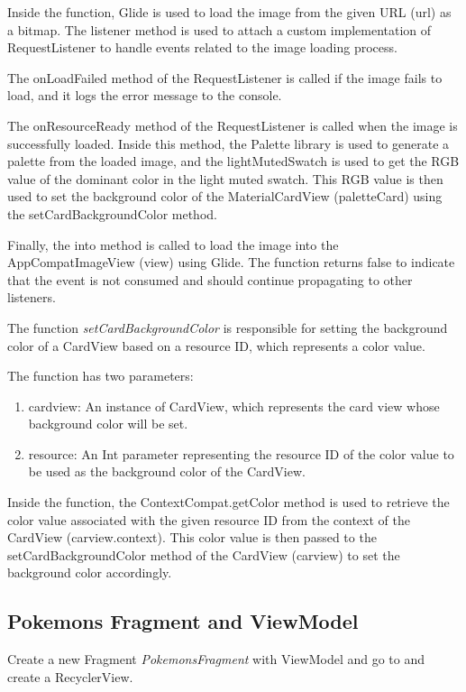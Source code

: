 \documentclass[a4paper, 12pt]{article}
\begin{document}
Inside the function, Glide is used to load the image from the given URL (url) as a bitmap. The listener method is used to attach a custom implementation of 
RequestListener to handle events related to the image loading process.

The onLoadFailed method of the RequestListener is called if the image fails to load, and it logs the error message to the console.

The onResourceReady method of the RequestListener is called when the image is successfully loaded. Inside this method, the Palette library is used to generate a palette from the loaded image, and the lightMutedSwatch is used to get the RGB value of the dominant color in the light muted swatch. This RGB value is then used to set the background color of the MaterialCardView (paletteCard) using the setCardBackgroundColor method.

Finally, the into method is called to load the image into the AppCompatImageView (view) using Glide. The function returns false to indicate that the event is not consumed and should continue propagating to other listeners.

The function \textit{setCardBackgroundColor} is responsible for setting the background color of a CardView based on a resource ID, which represents a color value.

The function has two parameters:

\begin{enumerate}
    \item cardview: An instance of CardView, which represents the card view whose background color will be set.
    \item resource: An Int parameter representing the resource ID of the color value to be used as the background color of the CardView.
\end{enumerate}

Inside the function, the ContextCompat.getColor method is used to retrieve the color value associated with the given resource ID from the context of the CardView (carview.context).
This color value is then passed to the setCardBackgroundColor method of the CardView (carview) to set the background color accordingly.



\subsection{Pokemons Fragment and ViewModel}

Create a new Fragment \textit{PokemonsFragment} with ViewModel and go to \textit{\texttt{}} and create a RecyclerView.
\end{document}
